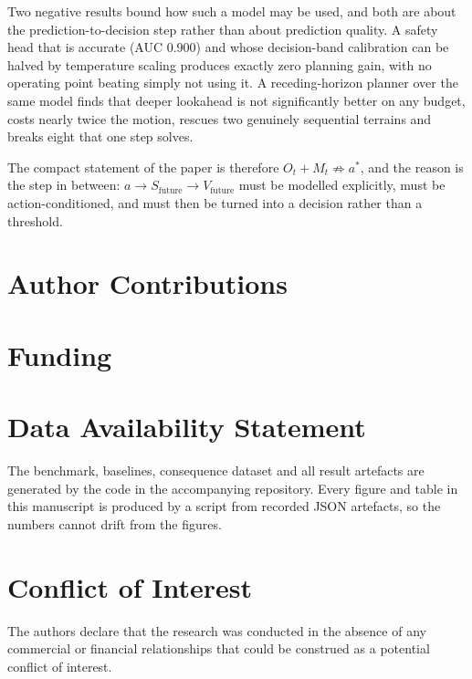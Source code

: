\documentclass[utf8]{FrontiersinHarvard}
\begin{document}
Two negative results bound how such a model may be used, and both are about the
prediction-to-decision step rather than about prediction quality. A safety head that is
accurate (AUC 0.900) and whose decision-band calibration can be halved by temperature
scaling produces exactly zero planning gain, with no operating point beating simply not
using it. A receding-horizon planner over the same model finds that deeper lookahead is
not significantly better on any budget, costs nearly twice the motion, rescues two
genuinely sequential terrains and breaks eight that one step solves.

The compact statement of the paper is therefore
$O_t + M_t \not\Rightarrow a^{*}$, and the reason is the step in between:
$a \rightarrow S_{\text{future}} \rightarrow V_{\text{future}}$ must be modelled
explicitly, must be action-conditioned, and must then be turned into a decision rather
than a threshold.

\section*{Author Contributions}


\section*{Funding}


\section*{Data Availability Statement}

The benchmark, baselines, consequence dataset and all result artefacts are generated by
the code in the accompanying repository. Every figure and table in this manuscript is
produced by a script from recorded JSON artefacts, so the numbers cannot drift from the
figures.

\section*{Conflict of Interest}

The authors declare that the research was conducted in the absence of any commercial or
financial relationships that could be construed as a potential conflict of interest.



\end{document}
